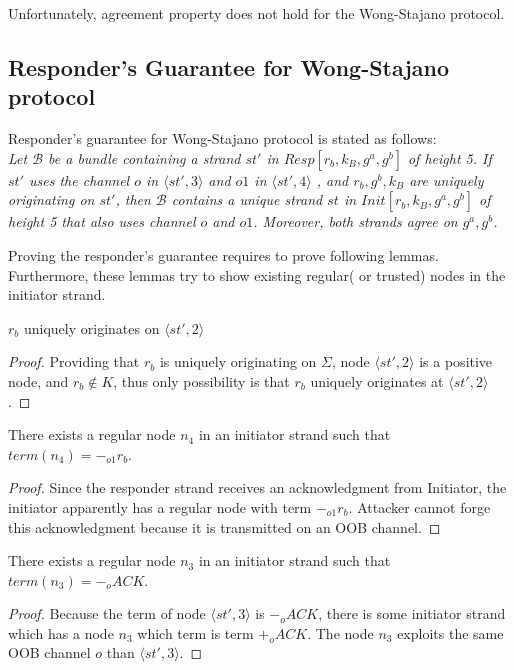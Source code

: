 Unfortunately, agreement property does not hold for the Wong-Stajano protocol. 

\subsection{Responder's Guarantee for Wong-Stajano protocol} 

Responder's guarantee for Wong-Stajano protocol is stated as follows:\\
\textit{Let $\mathcal{B}$ be a bundle containing a strand $st'$ in $Resp[r_b, k_B,g^a,g^b]$ of height 5. If $st'$ uses the channel $o$ in $\langle st',3 \rangle$ and $o1$ in $\langle st',4 \rangle$ , and $r_b, g^b, k_B$ are uniquely originating on $st'$, then $\mathcal{B}$ contains a unique strand $st$ in $Init[r_b, k_B,g^a,g^b]$ of height 5 that also uses channel $o$ and $o1$. Moreover, both strands agree on $g^a,g^b$.}

Proving the responder's guarantee requires to prove following lemmas. Furthermore, these lemmas try to show existing regular( or trusted) nodes in the initiator strand.  

\begin{Lemma}
$r_b$ uniquely originates on $\langle st',2 \rangle$ 
\end{Lemma}
\begin{proof}
Providing that $r_b$ is uniquely originating on $\Sigma$, node $\langle st',2 \rangle $ is a positive node, and $r_b \not\in K$, thus only possibility is that $r_b$ uniquely originates at $\langle st',2 \rangle$ .
\end{proof}

\begin{Lemma}
There exists a regular node $n_4$ in an initiator strand such that $term(n_4) = -_{o1} r_b$.
\end{Lemma}
\begin{proof}
Since the responder strand receives an acknowledgment from Initiator, the initiator apparently has a regular node with term $-_{o1} r_b$. Attacker cannot forge this acknowledgment because it is transmitted on an OOB channel. 
\end{proof}

\begin{Lemma}
There exists a regular node $n_3$ in an initiator strand such that $term(n_3) = -_o ACK$.
\end{Lemma}
\begin{proof}
Because the term of node $\langle st',3 \rangle$ is $-_o ACK$, there is some initiator strand which has a node $n_3$ which term is term $+_o ACK$. The node $n_3$ exploits the same OOB channel $o$ than $\langle st',3 \rangle$.
\end{proof}

